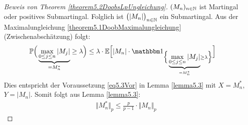 \begin{proof}[Beweis von Theorem \ref{theorem5.2DoobsLpUngleichung}]\enter
$(M_n)_{n\in\mathbb{N}}$ ist Martingal oder positives Submartingal. Folglich ist $\big(|M_n|\big)_{n\in\mathbb{N}}$ ein Submartingal. Aus der Maximalungleichung \ref{theorem5.1DoobMaximalungleichung} (Zwischenabschätzung) folgt:
\begin{align*}
\P\Big(\underbrace{\max\limits_{0\leq j\leq n}|M_j|}_{=M_n^\ast}\geq\lambda\Big)
&\leq\lambda\cdot\E\Big[|M_n|\cdot\indi_{\Big\lbrace\underbrace{\max\limits_{0\leq j\leq n}|M_j|}_{=M_n^\ast}\geq\lambda\Big\rbrace}\Big]
\end{align*}
Dies entspricht der Voraussetzung \eqref{eq5.3Vor} in Lemma \ref{lemma5.3} mit $X=M_n^\ast$, $Y=|M_n|$. Somit folgt aus Lemma \ref{lemma5.3}:
\begin{align*}
\big\Vert M_n^\ast\big\Vert_p\leq\frac{p}{p-1}\cdot\big\Vert M_n\big\Vert_p
\end{align*}
\end{proof}

